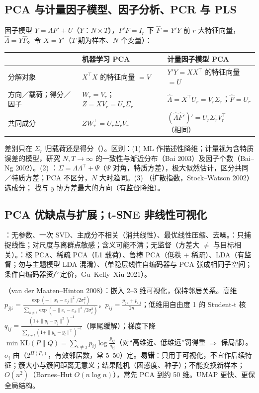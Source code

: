 \subsection{PCA 与计量因子模型、因子分析、PCR 与 PLS}
因子模型 $Y=\Lambda F'+U$（$Y$：$N\times T$），$F'F=I_r$ 下 $\hat F$ = $Y'Y$ 前 $r$ 大特征向量，$\hat\Lambda=Y\hat F$。令 $X=Y'$（$T$ 期为样本、$N$ 个变量）：
\begin{center}\small
\begin{tabularx}{\linewidth}{@{}p{2.3cm}LL@{}}
\toprule
 & 机器学习 PCA & 计量因子模型 PCA\\
\midrule
分解对象 & $X^\top X$ 的特征向量 $=V$ & $Y'Y=XX^\top$ 的特征向量 $=U$\\
方向／载荷；得分／因子 & $W_r=V_r$；$Z=XV_r=U_r\Sigma_r$ & $\hat\Lambda=X^\top U_r=V_r\Sigma_r$；$\hat F=U_r$\\
共同成分 & $ZW_r^\top=U_r\Sigma_rV_r^\top$ & $(\hat\Lambda\hat F')'=U_r\Sigma_rV_r^\top$（相同）\\
\bottomrule
\end{tabularx}
\end{center}
差别只在 $\Sigma_r$ 归载荷还是得分（）。区别：(1) ML 作描述性降维；计量视为含特质误差的模型，研究 $N,T\to\infty$ 的一致性与渐近分布（Bai 2003）及因子个数（Bai–Ng 2002）。(2) ：$\Sigma=\Lambda\Lambda^\top+\Psi$（$\Psi$ 对角，特质方差），极大似然估计，区分共同／特质方差；PCA 不区分，$N$ 大时趋同。(3) （扩散指数，Stock–Watson 2002）选成分； 找与 $y$ 协方差最大的方向（有监督降维）。

\subsection{PCA 优缺点与扩展；t-SNE 非线性可视化}
：无参数、一次 SVD、主成分不相关（消共线性）、最优线性压缩、去噪。：只捕捉线性；对尺度与离群点敏感；含义可能不清；无监督（方差大 $\ne$ 与目标相关）。：核 PCA、稀疏 PCA（L1 载荷）、鲁棒 PCA（低秩 + 稀疏）、LDA（有监督；勿与主题模型 LDA 混淆）、（单隐层线性自编码器与 PCA 张成相同子空间；条件自编码器资产定价，Gu–Kelly–Xiu 2021）。

\noindent{}（van der Maaten–Hinton 2008）：嵌入 2–3 维可视化，保持邻居关系。高维 $p_{j|i}=\frac{\exp(-\|x_i-x_j\|^2/2\sigma_i^2)}{\sum_{k\ne i}\exp(-\|x_i-x_k\|^2/2\sigma_i^2)}$，$p_{ij}=\frac{p_{j|i}+p_{i|j}}{2n}$；低维用自由度 1 的 Student-t 核 $q_{ij}=\frac{(1+\|y_i-y_j\|^2)^{-1}}{\sum_{k\ne l}(1+\|y_k-y_l\|^2)^{-1}}$（厚尾缓解）；梯度下降 $\min\mathrm{KL}(P\|Q)=\sum_{i\ne j}p_{ij}\log\frac{p_{ij}}{q_{ij}}$（对“高维近、低维远”罚得重 $\Rightarrow$ 保局部）。$\sigma_i$ 由（$2^{H(P_i)}$，有效邻居数，常 5–50）定。\textbf{易错}：只用于可视化，不宜作后续特征；簇大小与簇间距离无意义；结果随机（困惑度、种子）；不能变换新样本；$O(n^2)$（Barnes–Hut $O(n\log n)$），常先 PCA 到约 50 维。UMAP 更快、更保全局结构。

